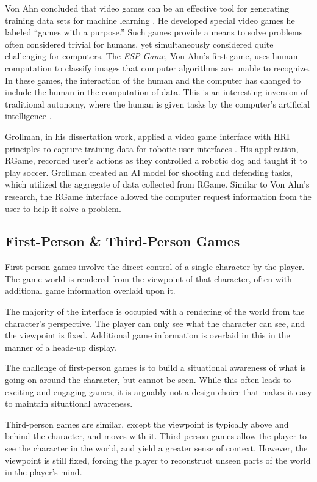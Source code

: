 Von Ahn concluded that video games can be an effective tool for generating training data sets for machine learning \cite{GWAP}. He developed special video games he labeled ``games with a purpose.''  Such games provide a means to solve problems often considered trivial for humans, yet simultaneously considered quite challenging for computers. The \emph{ESP Game}, Von Ahn's first game, uses human computation to classify images that computer algorithms are unable to recognize. In these games, the interaction of the human and the computer has changed to include the human in the computation of data. This is an interesting inversion of traditional autonomy, where the human is given tasks by the computer's artificial intelligence \cite{GWAP}.

Grollman, in his dissertation work, applied a video game interface with HRI principles to capture training data for robotic user interfaces \cite{Grollman}. His application, RGame, recorded user’s actions as they controlled a robotic dog and taught it to play soccer. Grollman created an AI model for shooting and defending tasks, which utilized the aggregate of data collected from RGame. Similar to Von Ahn's research, the RGame interface allowed the computer request information from the user to help it solve a problem.

\subsection{First-Person \& Third-Person Games} %
\label{sub:first_person_games}
First-person games involve the direct control of a single character by the player. The game world is rendered from the viewpoint of that character, often with additional game information overlaid upon it. 

The majority of the interface is occupied with a rendering of the world from the character’s perspective. The player can only see what the character can see, and the viewpoint is fixed. Additional game information is overlaid in this in the manner of a heads-up display.

The challenge of first-person games is to build a situational awareness of what is going on around the character, but cannot be seen. While this often leads to exciting and engaging games, it is arguably not a design choice that makes it easy to maintain situational awareness.

Third-person games are similar, except the viewpoint is typically above and behind the character, and moves with it. Third-person games allow the player to see the character in the world, and yield a greater sense of context. However, the viewpoint is still fixed, forcing the player to reconstruct unseen parts of the world in the player's mind.


